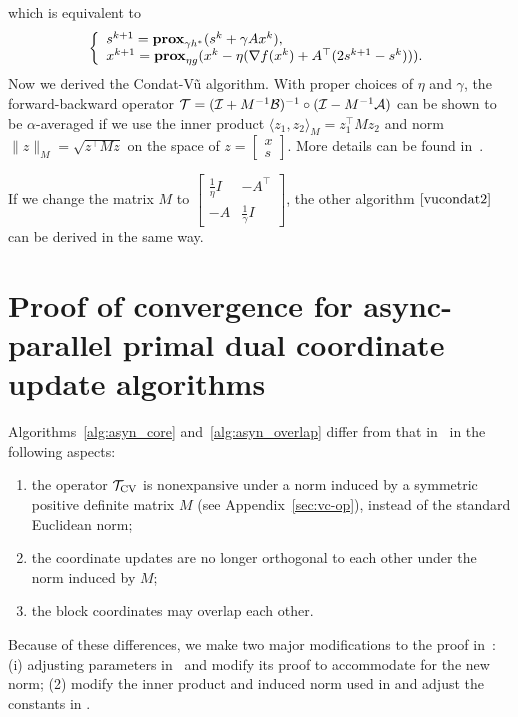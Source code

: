 which is equivalent to
$$\left\{
\begin{array}{l}
s^{k+1}=\prox_{\gamma h^*} (s^k+\gamma Ax^k),\\
x^{k+1}=\prox_{\eta g}(x^k-\eta(\nabla f(x^k)+A^\top(2s^{k+1}-s^k))).
\end{array}
\right.$$
Now we derived the Condat-V\~{u} algorithm. With proper choices of $\eta$ and $\gamma $, the forward-backward operator ${\mathcal{T}}=({\mathcal{I}}+M^{-1}{\mathcal{B}})^{-1}\circ({\mathcal{I}}-M^{-1}{\mathcal{A}})$ can be shown to be $\alpha$-averaged if we use the inner product $\langle z_1,z_2\rangle_M=z_1^\top Mz_2$ and norm $\|z\|_M=\sqrt{z^\top Mz}$ on the space of $z=\begin{bmatrix}x\\ s\end{bmatrix}$. More details can be found in~\cite{davis2014convergence}.

If we change the matrix $M$ to $\begin{bmatrix}
\frac{1}{\eta}I&-A^\top\\
-A&\frac{1}{\gamma}I
\end{bmatrix}$, the other algorithm $\eqref{vucondat2}$ can be derived in the same way.
\section{Proof of convergence for async-parallel primal dual coordinate update algorithms}\label{pf:pdasync}
Algorithms~\ref{alg:asyn_core} and~\ref{alg:asyn_overlap} differ from that in~\cite{Peng_2015_AROCK} in the following aspects:
\begin{enumerate}
\item the operator ${{\mathcal{T}}_{\textnormal{CV}}}$ is nonexpansive under a norm induced by a symmetric positive definite matrix $M$ (see Appendix~\ref{sec:vc-op}), instead of the standard Euclidean norm;
\item the coordinate updates are no longer orthogonal to each other under the norm induced by $M$;
\item the block coordinates may overlap each other.
\end{enumerate}
Because of these differences, we make two major modifications to the proof in~\cite[Section 3]{Peng_2015_AROCK}: (i) adjusting parameters in~\cite[Lemma 2]{Peng_2015_AROCK} and modify its proof to accommodate for the new norm; (2) modify the inner product and induced norm used in \cite[Theorem 2]{Peng_2015_AROCK} and adjust the constants in \cite[Theorems 2 and 3]{Peng_2015_AROCK}.

